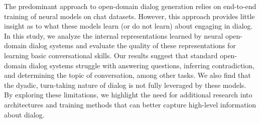 The predominant approach to open-domain dialog generation relies on end-to-end training of neural models on chat datasets. However, this approach provides little insight as to what these models learn (or do not learn) about engaging in dialog. In this study, we analyze the internal representations learned by neural open-domain dialog systems and evaluate the quality of these representations for learning basic conversational skills. Our results suggest that standard open-domain dialog systems struggle with answering questions, inferring contradiction, and determining the topic of conversation, among other tasks. We also find that the dyadic, turn-taking nature of dialog is not fully leveraged by these models. By exploring these limitations, we highlight the need for additional research into architectures and training methods that can better capture high-level information about dialog.
